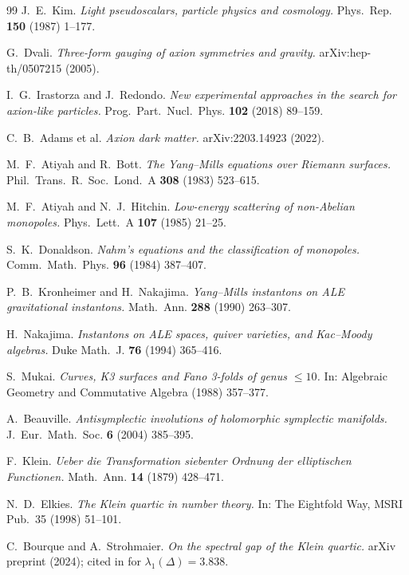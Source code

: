 \documentclass[11pt,a4paper]{article}
\theoremstyle{plain}
\theoremstyle{definition}
\theoremstyle{remark}
\begin{document}
\begin{thebibliography}{99}
J.~E.~Kim.
\textit{Light pseudoscalars, particle physics and cosmology.}
Phys.~Rep. \textbf{150} (1987) 1--177.

G.~Dvali.
\textit{Three-form gauging of axion symmetries and gravity.}
arXiv:hep-th/0507215 (2005).

I.~G.~Irastorza and J.~Redondo.
\textit{New experimental approaches in the search for axion-like particles.}
Prog.~Part.~Nucl.~Phys. \textbf{102} (2018) 89--159.

C.~B.~Adams et al.
\textit{Axion dark matter.}
arXiv:2203.14923 (2022).

M.~F.~Atiyah and R.~Bott.
\textit{The Yang--Mills equations over Riemann surfaces.}
Phil.~Trans.~R.~Soc.~Lond.~A \textbf{308} (1983) 523--615.

M.~F.~Atiyah and N.~J.~Hitchin.
\textit{Low-energy scattering of non-Abelian monopoles.}
Phys.~Lett.~A \textbf{107} (1985) 21--25.

S.~K.~Donaldson.
\textit{Nahm's equations and the classification of monopoles.}
Comm.~Math.~Phys. \textbf{96} (1984) 387--407.

P.~B.~Kronheimer and H.~Nakajima.
\textit{Yang--Mills instantons on ALE gravitational instantons.}
Math.~Ann. \textbf{288} (1990) 263--307.

H.~Nakajima.
\textit{Instantons on ALE spaces, quiver varieties, and Kac--Moody algebras.}
Duke Math.~J. \textbf{76} (1994) 365--416.

S.~Mukai.
\textit{Curves, K3 surfaces and Fano 3-folds of genus $\leq 10$.}
In: Algebraic Geometry and Commutative Algebra (1988) 357--377.

A.~Beauville.
\textit{Antisymplectic involutions of holomorphic symplectic manifolds.}
J.~Eur.~Math.~Soc. \textbf{6} (2004) 385--395.

F.~Klein.
\textit{Ueber die Transformation siebenter Ordnung der elliptischen Functionen.}
Math.~Ann. \textbf{14} (1879) 428--471.

N.~D.~Elkies.
\textit{The Klein quartic in number theory.}
In: The Eightfold Way, MSRI Pub.~35 (1998) 51--101.

C.~Bourque and A.~Strohmaier.
\textit{On the spectral gap of the Klein quartic.}
arXiv preprint (2024); cited in \cite{isaev2024spinor} for $\lambda_1(\Delta)=3.838$.


\end{thebibliography}
\end{document}
